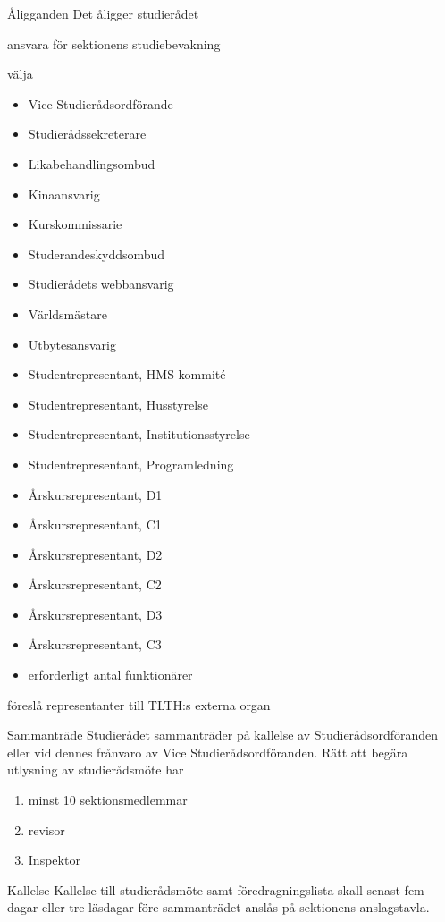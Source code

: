 \documentclass[pdfbookmarks,a4paper,11pt]{article}
\newlength{\itemcollength}
\newenvironment{reglemlista}{%
  \begin{list}{}{%
      \setlength{\labelwidth}{\itemcollength}%
      \setlength{\leftmargin}{\labelwidth + \labelsep}%
      \renewcommand{\makelabel}[1]{%
        \raisebox{0pt}[1ex][0pt]{%
          \makebox[\labelwidth][l]{%
            \parbox[t]{\itemcollength}{%
              \raggedright\hspace{0pt}##1}}}\hfill}%
      }}{%
  \end{list}}
\begin{document}
\begin{reglemlista}

	\item[Åligganden]
	Det åligger studierådet
	\begin{attlista}
		\item ansvara för sektionens studiebevakning
		\item välja
		\begin{itemize}
			\item Vice Studierådsordförande
			\item Studierådssekreterare
			\item Likabehandlingsombud
			\item Kinaansvarig
			\item Kurskommissarie
			\item Studerandeskyddsombud
			\item Studierådets webbansvarig
			\item Världsmästare
			\item Utbytesansvarig
			\item Studentrepresentant, HMS-kommité
			\item Studentrepresentant, Husstyrelse
			\item Studentrepresentant, Institutionsstyrelse
			\item Studentrepresentant, Programledning
			\item Årskursrepresentant, D1
			\item Årskursrepresentant, C1
			\item Årskursrepresentant, D2
			\item Årskursrepresentant, C2
			\item Årskursrepresentant, D3
			\item Årskursrepresentant, C3

			\item erforderligt antal funktionärer
		\end{itemize}
		\item föreslå representanter till TLTH:s externa organ
	\end{attlista}

	\item[Sammanträde]
	Studierådet sammanträder på kallelse av Studierådsordföranden eller vid
	dennes frånvaro av Vice Studierådsordföranden. Rätt att begära utlysning av
	studierådsmöte har
	\begin{enumerate}
		\item minst 10 sektionsmedlemmar
		\item revisor
		\item Inspektor
	\end{enumerate}

	\item[Kallelse]
	Kallelse till studierådsmöte samt föredragningslista skall senast fem
	dagar eller tre läsdagar före sammanträdet anslås på sektionens
	anslagstavla.

\end{reglemlista}
\end{document}
